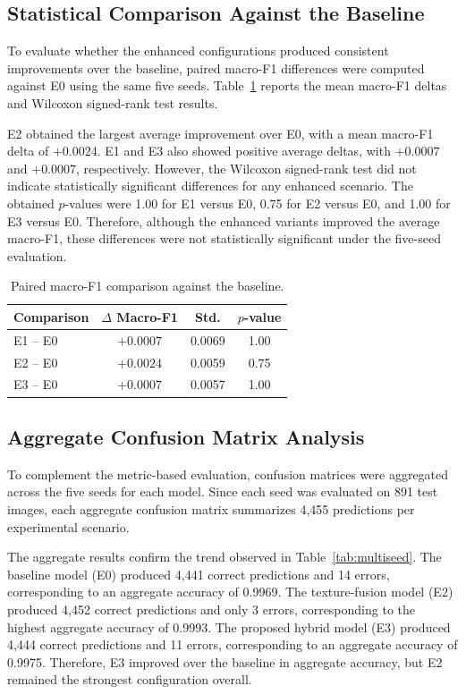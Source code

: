 \subsection{Statistical Comparison Against the Baseline}

To evaluate whether the enhanced configurations produced consistent improvements over the baseline, paired macro-F1 differences were computed against E0 using the same five seeds. Table~\ref{tab:statistical_comparison} reports the mean macro-F1 deltas and Wilcoxon signed-rank test results.

E2 obtained the largest average improvement over E0, with a mean macro-F1 delta of $+0.0024$. E1 and E3 also showed positive average deltas, with $+0.0007$ and $+0.0007$, respectively. However, the Wilcoxon signed-rank test did not indicate statistically significant differences for any enhanced scenario. The obtained $p$-values were 1.00 for E1 versus E0, 0.75 for E2 versus E0, and 1.00 for E3 versus E0. Therefore, although the enhanced variants improved the average macro-F1, these differences were not statistically significant under the five-seed evaluation.

\begin{table}[t]
\caption{Paired macro-F1 comparison against the baseline.}
\label{tab:statistical_comparison}
\centering
\footnotesize
\setlength{\tabcolsep}{4pt}
\begin{tabular}{lccc}
\toprule
Comparison & $\Delta$ Macro-F1 & Std. & $p$-value \\
\midrule
E1 -- E0 & $+0.0007$ & 0.0069 & 1.00 \\
E2 -- E0 & $+0.0024$ & 0.0059 & 0.75 \\
E3 -- E0 & $+0.0007$ & 0.0057 & 1.00 \\
\bottomrule
\end{tabular}
\end{table}

\subsection{Aggregate Confusion Matrix Analysis}

To complement the metric-based evaluation, confusion matrices were aggregated across the five seeds for each model. Since each seed was evaluated on 891 test images, each aggregate confusion matrix summarizes 4,455 predictions per experimental scenario.

The aggregate results confirm the trend observed in Table~\ref{tab:multiseed}. The baseline model (E0) produced 4,441 correct predictions and 14 errors, corresponding to an aggregate accuracy of 0.9969. The texture-fusion model (E2) produced 4,452 correct predictions and only 3 errors, corresponding to the highest aggregate accuracy of 0.9993. The proposed hybrid model (E3) produced 4,444 correct predictions and 11 errors, corresponding to an aggregate accuracy of 0.9975. Therefore, E3 improved over the baseline in aggregate accuracy, but E2 remained the strongest configuration overall.

